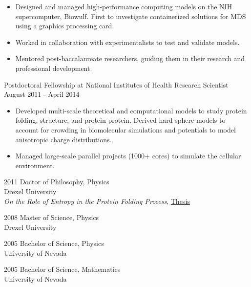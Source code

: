 \documentclass[]{scrartcl}
\begin{document}
\begin{cleanCV}
{\begin{itemize}
  \item Designed and managed high-performance computing models on the NIH supercomputer, Biowulf. First to investigate containerized solutions for MDS using a graphics processing card.

  \item Worked in collaboration with experimentalists to test and validate models.
   \item Mentored post-baccalaureate researchers, guiding them in their research and professional development.

  \end{itemize}
}


\WorkExperience
{}
{Postdoctoral Fellowship at National Institutes of Health}
{\newline Research Scientist}
{
  \newline August 2011 - April 2014
}
{
  \begin{itemize}
  \item Developed multi-scale theoretical and computational models to study protein folding, structure, and protein-protein. Derived hard-sphere models to account for crowding in biomolecular simulations and potentials to model anisotropic charge distributions.
  \item Managed large-scale parallel projects (1000+ cores) to simulate the cellular environment.
  \end{itemize}
}



\WorkExperience
{2011}
{Doctor of Philosophy, Physics}
{
\\Drexel University
\\\emph{On the Role of Entropy in the Protein Folding Process}, \href{https://idea.library.drexel.edu/islandora/object/idea:3488}{Thesis}
}

\WorkExperience
{2008}
{Master of Science, Physics}
{\\Drexel University}

\WorkExperience
{2005}
{Bachelor of Science, Physics}
{\\University of Nevada}

\WorkExperience
{2005}
{Bachelor of Science, Mathematics}
{\\University of Nevada}


\end{cleanCV}
\end{document}
